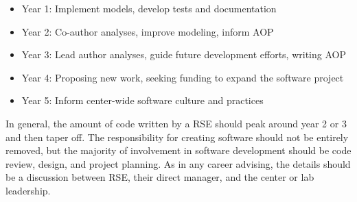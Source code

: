 \documentclass[]{nrel}
\begin{document}
\begin{appendices}
\begin{itemize}
\item Year 1: Implement models, develop tests and documentation
\item Year 2: Co-author analyses, improve modeling, inform AOP
\item Year 3: Lead author analyses, guide future development efforts, writing AOP
\item Year 4: Proposing new work, seeking funding to expand the software project
\item Year 5: Inform center-wide software culture and practices
\end{itemize}

In general, the amount of code written by a RSE should peak around year 2 or 3 and
then taper off. The responsibility for creating software should not be entirely removed, but
the majority of involvement in software development should be code review, design, and
project planning. As in any career advising, the details should be a discussion between RSE, their
direct manager, and the center or lab leadership.


\end{appendices}
\end{document}
